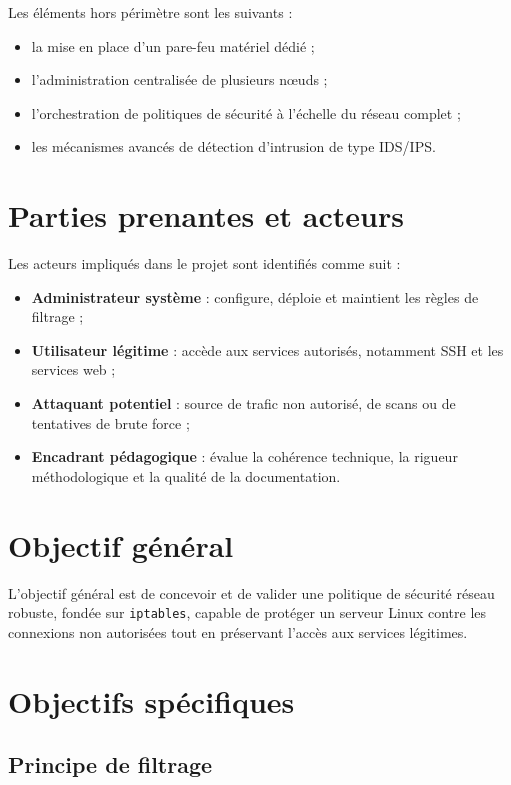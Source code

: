 Les éléments hors périmètre sont les suivants :
\begin{itemize}
    \item la mise en place d'un pare-feu matériel dédié ;
    \item l'administration centralisée de plusieurs nœuds ;
    \item l'orchestration de politiques de sécurité à l'échelle du réseau complet ;
    \item les mécanismes avancés de détection d'intrusion de type IDS/IPS.
\end{itemize}

\section{Parties prenantes et acteurs}

Les acteurs impliqués dans le projet sont identifiés comme suit :
\begin{itemize}
    \item \textbf{Administrateur système} : configure, déploie et maintient les règles de filtrage ;
    \item \textbf{Utilisateur légitime} : accède aux services autorisés, notamment SSH et les services web ;
    \item \textbf{Attaquant potentiel} : source de trafic non autorisé, de scans ou de tentatives de brute force ;
    \item \textbf{Encadrant pédagogique} : évalue la cohérence technique, la rigueur méthodologique et la qualité de la documentation.
\end{itemize}

\section{Objectif général}

L'objectif général est de concevoir et de valider une politique de sécurité réseau robuste, fondée sur \texttt{iptables}, capable de protéger un serveur Linux contre les connexions non autorisées tout en préservant l'accès aux services légitimes.

\section{Objectifs spécifiques}

\subsection{Principe de filtrage}

